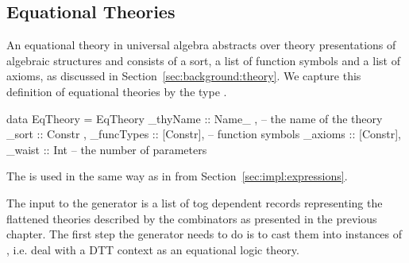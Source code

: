 
\subsection{Equational Theories}
\label{subsec:generation:eqTheories}
An equational theory in universal algebra abstracts over theory presentations of algebraic structures and consists of a sort, a list of function symbols and a list of axioms, as discussed in Section~\ref{sec:background:theory}. We capture this definition of equational theories by the type . 
\begin{hscode}
data EqTheory = EqTheory {
  _thyName    :: Name_  ,   -- the name of the theory 
  _sort       :: Constr ,      
  _funcTypes  :: [Constr], -- function symbols 
  _axioms     :: [Constr],
  _waist      :: Int }     -- the number of parameters 
\end{hscode}
The  is used in the same way as in  from Section~\ref{sec:impl:expressions}. 

The input to the generator is a list of tog dependent records representing the flattened theories described by the combinators as presented in the previous chapter. The first step the generator needs to do is to cast them into instances of , i.e. deal with a DTT context as an equational logic theory. 
\begin{comment}
This is done using the function \lstmath{recordToEqTheory}. 
\begin{hscode}
recordToEqTheory :: TRecord -> Eq.EqTheory
recordToEqTheory record@(TRecord nm params _) =
  Eq.build (nm^.name) 
    (getRecordSort record)
    (getRecordComps isFunc record)
    (getRecordComps isAxiom record)
    (paramsNum params)
\end{hscode}
In tog, records definitions are declared using the \lstmath{Record} constructor of the type \lstmath{Decl}, which contains many other constructors used to define functions, types, and others. We prefer to use a type dedicated to records, and therefore use the \lstmath{TRecord} type instead. \lstmath{TRecord} has the exact same parameters as the \lstmath{Record} constructor. 
\end{comment}

